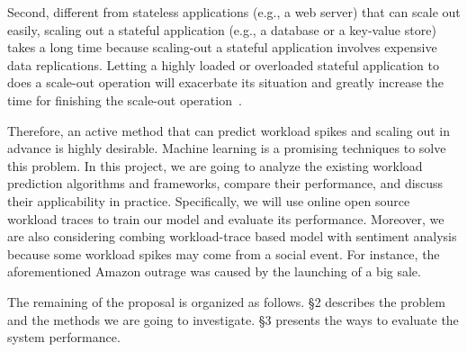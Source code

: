 Second, different from stateless applications (e.g., a web server) that can
scale out easily, scaling out a stateful application (e.g., a database or a
key-value store) takes a long time because scaling-out a stateful application
involves expensive data replications. Letting a highly loaded or overloaded
stateful application to does a scale-out operation will exacerbate its situation
and greatly increase the time for finishing the scale-out
operation~\cite{kulkarni2017rocksteady}. 


Therefore, an active method that can predict workload spikes and scaling out in
advance is highly desirable. Machine learning is a promising techniques to solve
this problem. 
In this project, we are going to analyze the existing workload prediction
algorithms and frameworks, compare their performance, and discuss their
applicability in practice. Specifically, we will use online open source workload
traces to train our model and evaluate its performance. Moreover, we are also
considering combing workload-trace based model with sentiment analysis because
some workload spikes may come from a social event. For instance, the aforementioned Amazon
outrage was caused by the launching of a big sale.

The remaining of the proposal is organized as follows. \S 2 describes the
problem and the methods we are going to investigate. \S 3 presents the ways to
evaluate the system performance.